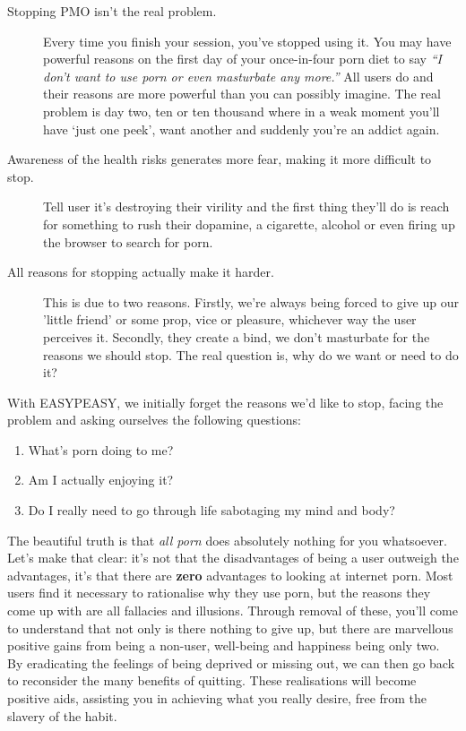 \documentclass[easypeasy.tex]{subfiles}
\begin{document}
\begin{description}
  \item [Stopping PMO isn't the real problem.] Every time you finish your session, you've stopped using it. You may have powerful reasons on the first day of your once-in-four porn diet to say \textit{``I don't want to use porn or even masturbate any more.''} All users do and their reasons are more powerful than you can possibly imagine. The real problem is day two, ten or ten thousand where in a weak moment you'll have `just one peek', want another and suddenly you're an addict again.

\item [Awareness of the health risks generates more fear, making it more difficult to stop.] Tell user it's destroying their virility and the first thing they'll do is reach for something to rush their dopamine, a cigarette, alcohol or even firing up the browser to search for porn.

\item [All reasons for stopping actually make it harder.] This is due to two reasons. Firstly, we're always being forced to give up our 'little friend' or some prop, vice or pleasure, whichever way the user perceives it. Secondly, they create a bind, we don't masturbate for the reasons we should stop. The real question is, why do we want or need to do it?
\end{description}

With EASYPEASY, we initially forget the reasons we'd like to stop, facing the problem and asking ourselves the following questions:

\begin{enumerate}
\item What's porn doing to me?
\item Am I actually enjoying it?
\item Do I really need to go through life sabotaging my mind and body?
\end{enumerate}

The beautiful truth is that \textit{all porn} does absolutely nothing for you whatsoever. Let's make that clear: it's not that the disadvantages of being a user outweigh the advantages, it's that there are \textbf{zero} advantages to looking at internet porn. Most users find it necessary to rationalise why they use porn, but the reasons they come up with are all fallacies and illusions. Through removal of these, you'll come to understand that not only is there nothing to give up, but there are marvellous positive gains from being a non-user, well-being and happiness being only two. By eradicating the feelings of being deprived or missing out, we can then go back to reconsider the many benefits of quitting. These realisations will become positive aids, assisting you in achieving what you really desire, free from the slavery of the habit.
\end{document}
